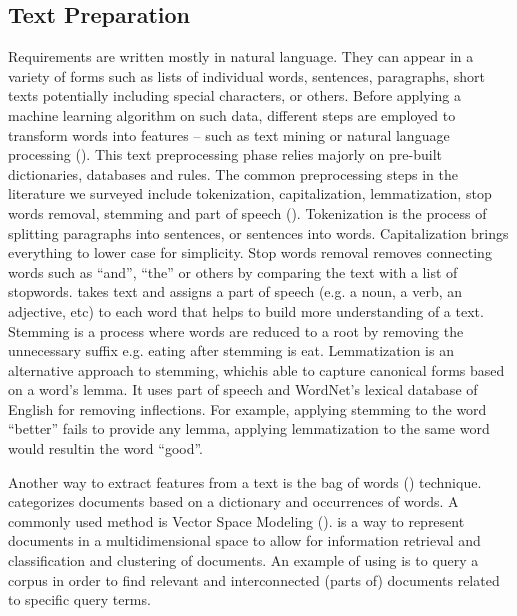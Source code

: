 \subsection{Text Preparation}
\label{sec:preprocessing}

Requirements are written mostly in natural language. They can appear in a
variety of forms such as lists of individual words, sentences, paragraphs, short
texts potentially including special characters, or others. Before applying a
machine learning algorithm on such data, different steps are employed to
transform words into features -- such as text mining or natural language
processing (\NLP). This text preprocessing phase relies majorly on pre-built
dictionaries, databases and rules. The common preprocessing steps in the
literature we surveyed include tokenization, capitalization, lemmatization, stop
words removal, stemming and part of speech (\POS). Tokenization is the process
of splitting paragraphs into sentences, or sentences into words. Capitalization
brings everything to lower case for simplicity. Stop words removal removes
connecting words such as ``and'', ``the'' or others by comparing the text with a
list of stopwords. \POS takes text and assigns a part of speech (e.g. a noun, a
verb, an adjective, etc) to each word that helps to build more understanding of
a text. Stemming is a process where words are reduced to a root by removing the
unnecessary suffix e.g. eating after stemming is eat. Lemmatization is an alternative approach to stemming,
whichis able to capture canonical forms based on a word's lemma. It uses part of
speech and WordNet’s lexical database of English for removing
inflections. For example, applying stemming to the word ``better'' fails to
provide any lemma, applying lemmatization to the same word would resultin the
word ``good''.

 Another way to extract features from a text is the bag of words (\BOW)
 technique. \BOW categorizes documents based on a dictionary and occurrences of
 words. A commonly used \BOW method is Vector Space Modeling
 (\VSM). \VSM is a way to represent documents in a multidimensional space to
 allow for information retrieval and classification and clustering of documents.
 An example of using \VSM is to query a corpus in order to find relevant and
 interconnected (parts of) documents related to specific query terms.

